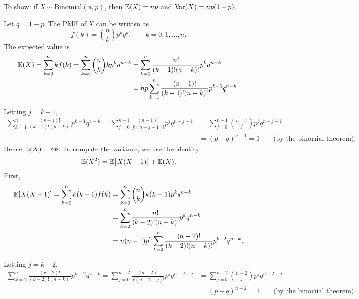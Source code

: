 \underline{To show}: if $X\sim\text{Binomial}(n,p)$, then $\mathbb{E}(X)=np$ and $\text{Var}(X)=np(1-p)$.

\vspace*{2ex}
Let $q=1-p$. The PMF of $X$ can be written as 
\[
f(k) = \binom{n}{k} p^k q^k,\qquad k=0,1,\ldots,n.
\]
The expected value is
\begin{align*}
\mathbb{E}(X)
	= \sum_{k=0}^{n} kf(k)
	= \sum_{k=0}^{n}\binom{n}{k} k p^{k}q^{n-k} 
	& = \sum_{k=1}^{n}\frac{n!}{(k-1)!(n-k)!} p^{k} q^{n-k} \\
	& = np\sum_{k=1}^{n}\frac{(n-1)!}{(k-1)!(n-k)!} p^{k-1} q^{n-k}.
\end{align*}

%
Letting $j=k-1$,
\begin{align*}
\sum_{k=1}^{n}\frac{(n-1)!}{(k-1)!(n-k)!} p^{k-1} q^{n-k}
	= \sum_{j=0}^{n-1}\frac{(n-1)!}{j!(n-j-1)!} p^{j} q^{n-j-1} 
	& = \sum_{j=0}^{n-1}\binom{n-1}{j} p^{j} q^{n-j-1} \\
	& = (p+q)^{n-1} = 1 \qquad\text{(by the binomial theorem).}
\end{align*}
Hence $\mathbb{E}(X)=np$.
To compute the variance, we use the identity 
\[
\mathbb{E}(X^2) = \mathbb{E}\big[X(X-1)\big]+\mathbb{E}(X).
\]
First,
\begin{align*}
\mathbb{E}[X(X - 1)]
	= \sum_{k=0}^{n} k(k-1)f(k) 
	& = \sum_{k=0}^{n} \binom{n}{k} k(k-1)p^{k} q^{n-k} \\
	& = \sum_{k=2}^{n}\frac{n!}{(k-2)!(n-k)!} p^{k} q^{n-k}  \\
	& = n(n-1)p^{2} \sum_{k=2}^{n}\frac{(n-2)!}{(k-2)!(n-k)!} p^{k-2} q^{n-k}.
\end{align*}


\vspace*{2ex}
Letting $j=k-2$,
\begin{align*}
\sum_{k=2}^{n}\frac{(n-2)!}{(k-2)!(n-k)!} p^{k-2} q^{n-k} 
	= \sum_{j=0}^{n-2}\frac{(n-2)!}{j!(n-2-j)!} p^{j} q^{n-2-j}
	& = \sum_{j=0}^{n-2}\binom{n-2}{j} p^{j} q^{n-2-j} \\
	& = (p+q)^{n-2} = 1\qquad\text{(by the binomial theorem).}
\end{align*}

